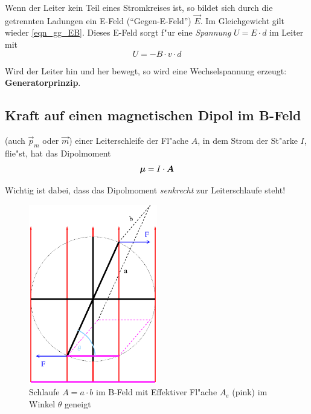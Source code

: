 Wenn der Leiter kein Teil eines Stromkreises ist, so bildet sich durch
die getrennten Ladungen ein E-Feld ("`Gegen-E-Feld"') $\vec E$. Im
Gleichgewicht gilt wieder \eqref{eqn_gg_EB}. Dieses E-Feld sorgt f"ur
eine \emph{Spannung} $U = {E} \cdot {d}$ im Leiter mit
\begin{equation*}
   U = - B \cdot v \cdot d
\end{equation*}

Wird der Leiter hin und her bewegt, so wird eine Wechselspannung
erzeugt: \textbf{Generatorprinzip}.




\subsection{Kraft auf einen magnetischen Dipol im B-Feld}
\label{kap_kraft-auf-einen-magnetischen-dipol}

\begin{Def}
    (auch $\vec p_m$ oder $\vec m$) einer Leiterschleife der
   Fl"ache $A$, in dem Strom der St"arke $I$, flie"st, hat das
   Dipolmoment
   \begin{equation}
      \label{eq:315}
      \boldsymbol{\mu} = I \cdot \boldsymbol{A}
   \end{equation}
\end{Def}
Wichtig ist dabei, dass das Dipolmoment \emph{senkrecht} zur
Leiterschlaufe steht!



\begin{figure}
   \centering
   \includegraphics[width=0.5\textwidth]{bilder/schlaufe_bfeld}
   \caption[Schlaufe im B-Feld]{Schlaufe $A = a \cdot b$ im B-Feld mit
     Effektiver Fl"ache $A_e$ (pink) im Winkel $\theta$ geneigt}
   \label{abb_schlaufe-bfeld}
\end{figure}

